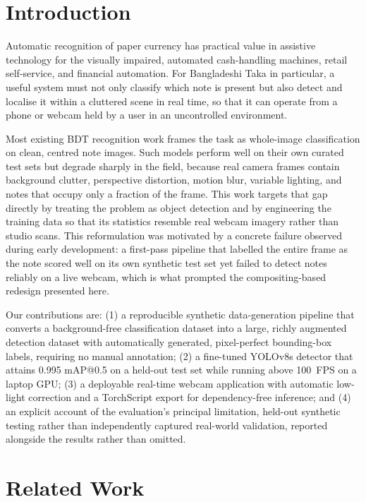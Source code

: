 \documentclass[10pt,twocolumn]{article}
\begin{document}
\section{Introduction}

Automatic recognition of paper currency has practical value in assistive technology for the visually impaired, automated cash-handling machines, retail self-service, and financial automation. For Bangladeshi Taka in particular, a useful system must not only classify which note is present but also detect and localise it within a cluttered scene in real time, so that it can operate from a phone or webcam held by a user in an uncontrolled environment.

Most existing BDT recognition work frames the task as whole-image classification on clean, centred note images. Such models perform well on their own curated test sets but degrade sharply in the field, because real camera frames contain background clutter, perspective distortion, motion blur, variable lighting, and notes that occupy only a fraction of the frame. This work targets that gap directly by treating the problem as object detection and by engineering the training data so that its statistics resemble real webcam imagery rather than studio scans. This reformulation was motivated by a concrete failure observed during early development: a first-pass pipeline that labelled the entire frame as the note scored well on its own synthetic test set yet failed to detect notes reliably on a live webcam, which is what prompted the compositing-based redesign presented here.

Our contributions are: (1) a reproducible synthetic data-generation pipeline that converts a background-free classification dataset into a large, richly augmented detection dataset with automatically generated, pixel-perfect bounding-box labels, requiring no manual annotation; (2) a fine-tuned YOLOv8s detector that attains 0.995 mAP@0.5 on a held-out test set while running above 100~FPS on a laptop GPU; (3) a deployable real-time webcam application with automatic low-light correction and a TorchScript export for dependency-free inference; and (4) an explicit account of the evaluation's principal limitation, held-out synthetic testing rather than independently captured real-world validation, reported alongside the results rather than omitted.

\section{Related Work}
\end{document}
